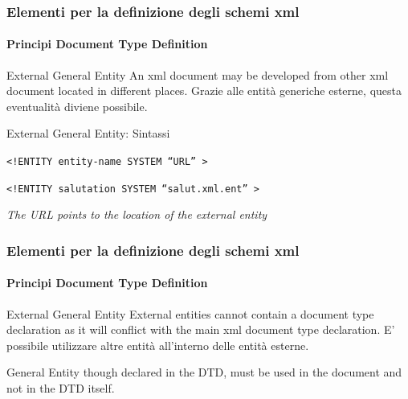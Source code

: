 \begin{frame}
    \frametitle{Elementi per la definizione degli schemi xml}
    \framesubtitle{Principi Document Type Definition}
    \addtocounter{nframe}{1}

    \begin{block}{External General Entity}
        An xml document may be developed from other xml document located in different places. Grazie alle entità generiche esterne, questa eventualità diviene possibile.
    \end{block}

    \begin{block}{External General Entity: Sintassi}
    \begin{center}\texttt{<!ENTITY entity-name SYSTEM ``URL'' >}\end{center}
    \begin{center}\texttt{<!ENTITY salutation SYSTEM ``salut.xml.ent'' >}\end{center}
    \end{block}
    \textit{The URL points to the location of the external entity}
\end{frame}

\begin{frame}
    \frametitle{Elementi per la definizione degli schemi xml}
    \framesubtitle{Principi Document Type Definition}
    \addtocounter{nframe}{1}

    \begin{block}{External General Entity}
        External entities cannot contain a document type declaration as it will conflict with the main xml document type declaration. E' possibile utilizzare altre entità all'interno delle entità esterne. 
    \end{block}

    \begin{block}{General Entity}
     though declared in the DTD, must be used in the document and not in the DTD itself. 
    \end{block}
\end{frame}

